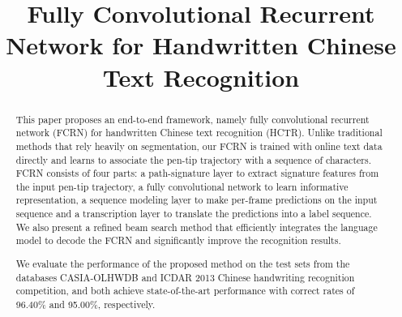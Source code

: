 \documentclass[10pt,conference,a4paper]{IEEEtran}
\begin{document}
\title{Fully Convolutional Recurrent Network for Handwritten Chinese Text Recognition}


\author{
}

\maketitle

\begin{abstract}
This paper proposes an end-to-end framework, namely fully convolutional recurrent network (FCRN) for handwritten Chinese text recognition (HCTR).
Unlike traditional methods that rely heavily on segmentation, our FCRN is trained with online text data directly and learns to associate the pen-tip trajectory with a sequence of characters.
FCRN consists of four parts: a path-signature layer to extract signature features from the input pen-tip trajectory, a fully convolutional network to learn informative representation, a sequence modeling layer to make per-frame predictions on the input sequence and a transcription layer to translate the predictions into a label sequence.
We also present a refined beam search method that efficiently integrates the language model to decode the FCRN and significantly improve the recognition results.


We evaluate the performance of the proposed method on the test sets from the databases CASIA-OLHWDB and ICDAR 2013 Chinese handwriting recognition competition, and both achieve state-of-the-art performance with correct rates of 96.40\% and 95.00\%, respectively.
\end{abstract}





\IEEEpeerreviewmaketitle
\end{document}
